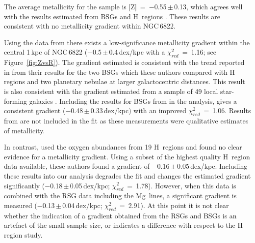 The average metallicity for the sample is [Z]~=~$-$0.55\,$\pm$\,0.13,
which agrees well with the results estimated from BSGs
\citep{1999A&A...352L..40M,2001ApJ...547..765V,2002PhDT.........3P} and H\,\2 regions
\citep{2006ApJ...642..813L}.
These results are consistent with no metallicity gradient within NGC\,6822.


Using the data from \citep[][i.e excluding Mg\,\1]{2015ApJ...803...14P} there exists a low-significance metallicity gradient within the central 1\,kpc of NGC\,6822
($-$0.5\,$\pm$\,0.4\,dex/kpc with a $\chi^{2}_{red}$~=~1.16; see Figure~\ref{fig:ZvsR}).
The gradient estimated is consistent with the trend reported in
\cite{2001ApJ...547..765V}
from their results for the two BSGs which these authors compared with H\,\2 regions
\citep{1980MNRAS.193..219P} and two planetary nebulae
\citep{1995ApJ...445..642R} at larger galactocentric distances.
This result is also consistent with the gradient estimated from a sample of 49 local star-forming galaxies
\citep{2015MNRAS.448.2030H}.
Including the results for BSGs from
\cite{2001ApJ...547..765V}
in the analysis,
gives a consistent gradient
($-$0.48\,$\pm$\,0.33\,dex/kpc)
with an improved
$\chi^{2}_{red}$~=~1.06.
Results from
\cite{1999A&A...352L..40M} are not included in the fit as these measurements were qualitative estimates of metallicity.



In contrast,
\cite{2006ApJ...642..813L} used the oxygen abundances from 19 H\,\2
regions and found no clear evidence for a metallicity gradient.
Using a subset of the highest quality H\,\2
region data available, these authors found a gradient of
$-$0.16\,$\pm$\,0.05\,dex/kpc.
Including these results into our analysis degrades the fit and changes the estimated gradient significantly
($-$0.18\,$\pm$\,0.05\,dex/kpc; $\chi^{2}_{red}$~=~1.78).
However, when this data is combined with the RSG data including the Mg\,\1 lines, a significant gradient is measured
($-$0.13\,$\pm$\,0.04\,dex/kpc; $\chi^{2}_{red}$~=~2.91).
At this point it is not clear whether the indication of a gradient obtained from the RSGs and BSGs is an artefact of the small sample size,
or indicates a difference with respect to the H\,\2 region study.


